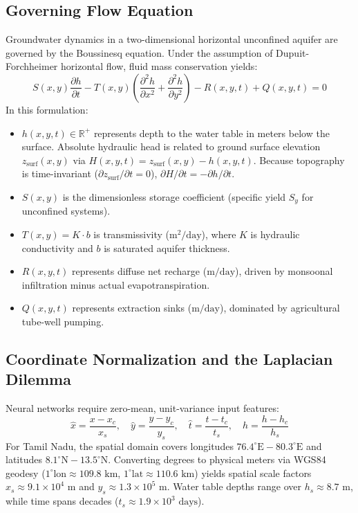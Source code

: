 \documentclass[10pt,conference,letterpaper]{IEEEtran}
\begin{document}
\subsection{Governing Flow Equation}
Groundwater dynamics in a two-dimensional horizontal unconfined aquifer are governed by the Boussinesq equation. Under the assumption of Dupuit-Forchheimer horizontal flow, fluid mass conservation yields:
\begin{equation}
S(x, y) \frac{\partial h}{\partial t} - T(x, y) \left( \frac{\partial^2 h}{\partial x^2} + \frac{\partial^2 h}{\partial y^2} \right) - R(x, y, t) + Q(x, y, t) = 0
\label{eq:boussinesq}
\end{equation}
In this formulation:
\begin{itemize}
    \item $h(x, y, t) \in \mathbb{R}^+$ represents depth to the water table in meters below the surface. Absolute hydraulic head is related to ground surface elevation $z_{\text{surf}}(x, y)$ via $H(x, y, t) = z_{\text{surf}}(x, y) - h(x, y, t)$. Because topography is time-invariant ($\partial z_{\text{surf}}/\partial t = 0$), $\partial H / \partial t = -\partial h / \partial t$.
    \item $S(x, y)$ is the dimensionless storage coefficient (specific yield $S_y$ for unconfined systems).
    \item $T(x, y) = K \cdot b$ is transmissivity ($\text{m}^2/\text{day}$), where $K$ is hydraulic conductivity and $b$ is saturated aquifer thickness.
    \item $R(x, y, t)$ represents diffuse net recharge ($\text{m}/\text{day}$), driven by monsoonal infiltration minus actual evapotranspiration.
    \item $Q(x, y, t)$ represents extraction sinks ($\text{m}/\text{day}$), dominated by agricultural tube-well pumping.
\end{itemize}

\subsection{Coordinate Normalization and the Laplacian Dilemma}
Neural networks require zero-mean, unit-variance input features:
\begin{equation}
\hat{x} = \frac{x - x_c}{x_s}, \quad \hat{y} = \frac{y - y_c}{y_s}, \quad \hat{t} = \frac{t - t_c}{t_s}, \quad \hat{h} = \frac{h - h_c}{h_s}
\end{equation}
For Tamil Nadu, the spatial domain covers longitudes $76.4^\circ\text{E} - 80.3^\circ\text{E}$ and latitudes $8.1^\circ\text{N} - 13.5^\circ\text{N}$. Converting degrees to physical meters via WGS84 geodesy ($1^\circ \text{lon} \approx 109.8\text{ km}$, $1^\circ \text{lat} \approx 110.6\text{ km}$) yields spatial scale factors $x_s \approx 9.1 \times 10^4\text{ m}$ and $y_s \approx 1.3 \times 10^5\text{ m}$. Water table depths range over $h_s \approx 8.7\text{ m}$, while time spans decades ($t_s \approx 1.9 \times 10^3\text{ days}$).
\end{document}
